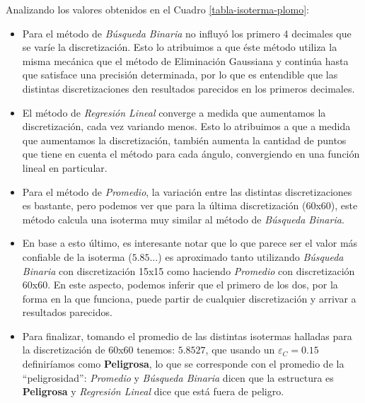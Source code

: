 Analizando los valores obtenidos en el Cuadro \ref{tabla-isoterma-plomo}:
\begin{itemize}
    \item Para el método de \textit{Búsqueda Binaria} no influyó los primero 4 decimales que se varíe la discretización. Esto lo atribuimos a que éste método utiliza la misma mecánica que el método de Eliminación Gaussiana y continúa hasta que satisface una precisión determinada, por lo que es entendible que las distintas discretizaciones den resultados parecidos en los primeros decimales.
    \item El método de \textit{Regresión Lineal} converge a medida que aumentamos la discretización, cada vez variando menos. Esto lo atribuimos a que a medida que aumentamos la discretización, también aumenta la cantidad de puntos que tiene en cuenta el método para cada ángulo, convergiendo en una función lineal en particular.
    \item Para el método de \textit{Promedio}, la variación entre las distintas
		discretizaciones es bastante, pero podemos ver que para la última discretización (60x60), este método calcula una isoterma muy similar al método de \textit{Búsqueda Binaria}.
    \item En base a esto último, es interesante notar que lo que parece ser el valor más confiable de la isoterma ($5.85\dots$) es aproximado tanto utilizando \textit{Búsqueda Binaria} con discretización 15x15 como haciendo \textit{Promedio} con discretización 60x60. En este aspecto, podemos inferir que el primero de los dos, por la forma en la que funciona, puede partir de cualquier discretización y arrivar a resultados parecidos.
    \item Para finalizar, tomando el promedio de las distintas isotermas halladas para la discretización de 60x60 tenemos: $5.8527$, que usando un $\varepsilon_C = 0.15$ definiríamos como \textbf{Peligrosa}, lo que se corresponde con el promedio de la ``peligrosidad'': \textit{Promedio} y \textit{Búsqueda Binaria} dicen que la estructura es \textbf{Peligrosa} y \textit{Regresión Lineal} dice que está fuera de peligro.
\end{itemize}

